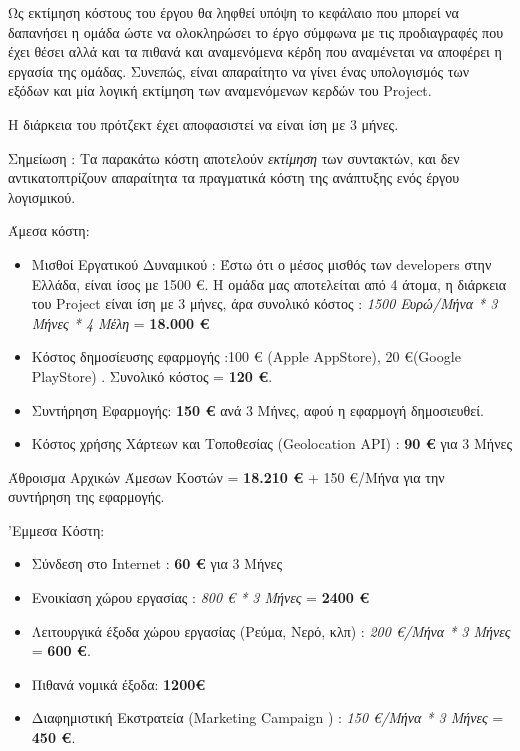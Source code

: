 \documentclass{../ol-softwaremanual}
\begin{document}
	\flushleft
	Ως εκτίμηση κόστους του έργου θα ληφθεί υπόψη το κεφάλαιο που μπορεί να δαπανήσει η ομάδα ώστε να ολοκληρώσει το έργο σύμφωνα με τις προδιαγραφές που έχει θέσει αλλά και τα πιθανά και αναμενόμενα κέρδη που αναμένεται να αποφέρει η εργασία της ομάδας. Συνεπώς, είναι απαραίτητο να γίνει ένας υπολογισμός των εξόδων και μία λογική εκτίμηση των αναμενόμενων κερδών του \en Project.\gr \\
	
	\vspace{10pt}
	
	
	Η διάρκεια του πρότζεκτ έχει αποφασιστεί να είναι ίση με 3 μήνες.
	
	\vspace{10pt}
	
	Σημείωση : Τα παρακάτω κόστη αποτελούν \textit{εκτίμηση} των συντακτών, και δεν αντικατοπτρίζουν απαραίτητα τα πραγματικά κόστη της ανάπτυξης ενός έργου λογισμικού. \\
	
	\vspace{10pt}
	
	
	Άμεσα κόστη:
	
	\begin{itemize}
		\item Μισθοί Εργατικού Δυναμικού : Έστω ότι ο μέσος μισθός των \en developers \gr στην Ελλάδα, είναι ίσος με 1500 €. Η ομάδα μας αποτελείται από 4 άτομα, η διάρκεια του \en Project \gr είναι ίση με 3 μήνες, άρα συνολικό κόστος : \textit{1500 Ευρώ/Μήνα * 3 Μήνες * 4 Μέλη  } = \textbf{18.000 €} 
		
		\item Κόστος δημοσίευσης εφαρμογής :100 € (\en Apple AppStore), 20 €(Google PlayStore)  \gr. Συνολικό κόστος = \textbf{120 €}.
		
		\item Συντήρηση Εφαρμογής: \textbf{150 €} ανά 3 Μήνες, αφού η εφαρμογή δημοσιευθεί.
		
		\item Κόστος χρήσης Χάρτεων και Τοποθεσίας (\en Geolocation API\gr) : \textbf{90 €}  για 3 Μήνες
	\end{itemize}
	
	Άθροισμα Αρχικών Άμεσων Κοστών = \textbf{18.210 €} + 150 €/Μήνα για την συντήρηση της εφαρμογής.
	
	\vspace{20pt}
	
	'Εμμεσα Κόστη:
	
	\begin{itemize}
		\item Σύνδεση στο \en Internet \gr : \textbf{60 €} για 3 Μήνες
		\item Ενοικίαση χώρου εργασίας : \textit{800 € * 3 Μήνες} = \textbf{2400 €}
		\item Λειτουργικά έξοδα χώρου εργασίας (Ρεύμα, Νερό, κλπ) : \textit{200 €/Μήνα * 3 Μήνες} = \textbf{600 €}. 
		\item Πιθανά νομικά έξοδα: \textbf{1200€}
		\item Διαφημιστική Εκστρατεία (\en Marketing Campaign \gr) : \textit{150 €/Μήνα * 3 Μήνες} = \textbf{450 €}.
	\end{itemize}
	
\end{document}
